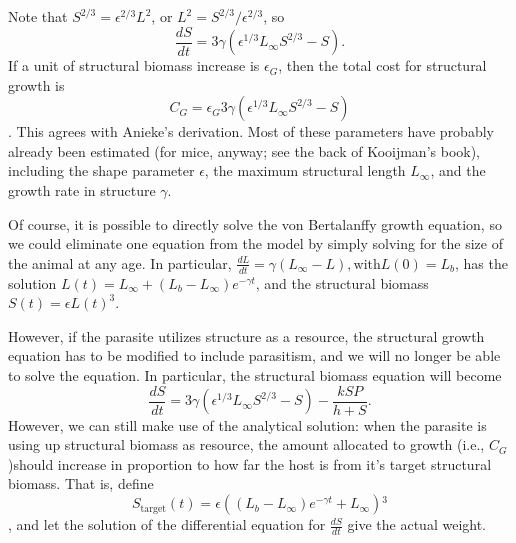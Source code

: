 \documentclass[11pt,reqno,final,pdftex]{amsart}\usepackage[]{graphicx}\usepackage[]{color}
\theoremstyle{plain}
\numberwithin{equation}{part}
\begin{document}
Note that $S^{2/3}=\epsilon ^{2/3}L^2$, or $L^2=S^{2/3}/\epsilon ^{2/3}$, so
\begin{equation}
\frac{dS}{dt}=3\gamma  \left(\epsilon ^{1/3}L_{\infty }S^{2/3}-S\right).
\end{equation}
If a unit of structural biomass increase is $\epsilon _G$, then the total cost for structural growth is
\begin{equation}
C_G = \epsilon _G 3\gamma  \left(\epsilon ^{1/3}L_{\infty }S^{2/3}-S\right)
\end{equation}.
This agrees with Anieke's derivation.
Most of these parameters have probably already been estimated (for mice, anyway; see the back of Kooijman's book), including the shape parameter $\epsilon$, the maximum structural length $L_{\infty }$, and the growth rate in structure $\gamma$.

Of course, it is possible to directly solve the von Bertalanffy growth equation, so we could eliminate one equation from the model by simply solving for the size of the animal at any age.
In particular, $\frac{dL}{dt}=\gamma \left(L_{\infty }-L\right), \text{with} L(0)=L_b$, has the solution $L(t)=L_{\infty }+\left(L_b-L_{\infty}\right)e^{-\gamma t}$, and the structural biomass $S(t)=\epsilon  L(t)^3$.

However, if the parasite utilizes structure as a resource, the structural growth equation has to be modified to include parasitism, and we will no longer be able to solve the equation.
In particular, the structural biomass equation will become
\begin{equation}
\frac{dS}{dt}=3\gamma  \left(\epsilon ^{1/3}L_{\infty }S^{2/3}-S\right)-\frac{k S P}{h+S}.
\end{equation}
However, we can still make use of the analytical solution: when the parasite is using up structural biomass as resource, the amount allocated to growth (i.e., $C_G$)should increase in proportion to how far the host is from it's target structural biomass.
That is, define
\begin{equation}
S_{\text{target}}(t)=\epsilon \left(\left(L_b-L_{\infty }\right) e^{-\gamma  t}+L_{\infty }\right){}^3
\end{equation}, and let the solution of the differential equation for $\frac{dS}{dt}$ give the actual weight.
\end{document}
